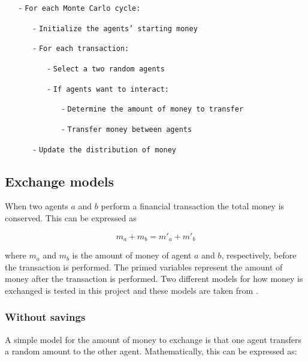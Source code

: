 \documentclass{article}
\begin{document}
\begin{framed}
\begin{itemize}
\item[-] \texttt{For each Monte Carlo cycle:}
\begin{itemize}
\item[-] \texttt{Initialize the agents' starting money}
\item[-] \texttt{For each transaction:}
\begin{itemize}
\item[-] \texttt{Select a two random agents} 
\item[-] \texttt{If agents want to interact:}
\begin{itemize}
\item[-] \texttt{Determine the amount of money to transfer}
\item[-] \texttt{Transfer money between agents}
\end{itemize}
\end{itemize}
\item[-] \texttt{Update the distribution of money}
\end{itemize}
\end{itemize}
\end{framed} 

\subsection{Exchange models}
\label{subsec:exchange}

When two agents $a$ and $b$ perform a financial transaction the total money is conserved. This can be expressed as

\begin{equation}
m_a + m_b = m'_a + m'_b 
\end{equation} 

\noindent where $m_a$ and $m_b$ is the amount of money of agent $a$ and $b$, respectively, before the transaction is performed. The primed variables represent the amount of money after the transaction is performed. Two different models for how money is exchanged is tested in this project and these models are taken from \cite{gibbs}.

\subsubsection{Without savings}
\label{subsec:without_save}
A simple model for the amount of money to exchange is that one agent transfers a random amount to the other agent. Mathematically, this can be expressed as:
\end{document}
